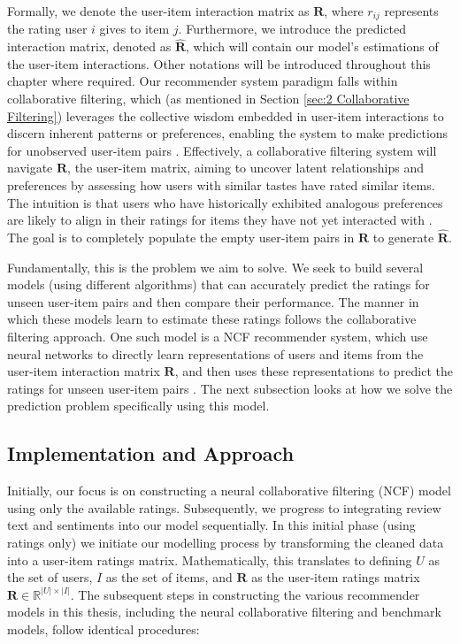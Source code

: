 Formally, we denote the user-item interaction matrix as $\mathbf{R}$, where $r_{ij}$ represents the rating user $i$ gives to item $j$. Furthermore, we introduce the predicted interaction matrix, denoted as $\mathbf{\hat{R}}$, which will contain our model's estimations of the user-item interactions. Other notations will be introduced throughout this chapter where required. Our recommender system paradigm falls within collaborative filtering, which (as mentioned in Section \ref{sec:2 Collaborative Filtering}) leverages the collective wisdom embedded in user-item interactions to discern inherent patterns or preferences, enabling the system to make predictions for unobserved user-item pairs \cite{koren2009collaborative}. Effectively, a collaborative filtering system will navigate $\mathbf{R}$, the user-item matrix, aiming to uncover latent relationships and preferences by assessing how users with similar tastes have rated similar items. The intuition is that users who have historically exhibited analogous preferences are likely to align in their ratings for items they have not yet interacted with \cite{koren2009collaborative}. The goal is to completely populate the empty user-item pairs in $\mathbf{R}$ to generate $\mathbf{\hat{R}}$.

Fundamentally, this is the problem we aim to solve. We seek to build several models (using different algorithms) that can accurately predict the ratings for unseen user-item pairs and then compare their performance. The manner in which these models learn to estimate these ratings follows the collaborative filtering approach. One such model is a NCF recommender system, which use neural networks to directly learn representations of users and items from the user-item interaction matrix $\mathbf{R}$, and then uses these representations to predict the ratings for unseen user-item pairs \cite{he2017neural}. The next subsection looks at how we solve the prediction problem specifically using this model.

\subsection{Implementation and Approach}
\label{subsec:4 Implementation and Approach}

Initially, our focus is on constructing a neural collaborative filtering (NCF) model using only the available ratings. Subsequently, we progress to integrating review text and sentiments into our model sequentially. In this initial phase (using ratings only) we initiate our modelling process by transforming the cleaned data into a user-item ratings matrix. Mathematically, this translates to defining $U$ as the set of users, $I$ as the set of items, and $\mathbf{R}$ as the user-item ratings matrix $\mathbf{R} \in \mathbb{R}^ {\lvert U \rvert \times \lvert I \rvert}$. The subsequent steps in constructing the various recommender models in this thesis, including the neural collaborative filtering and benchmark models, follow identical procedures:


